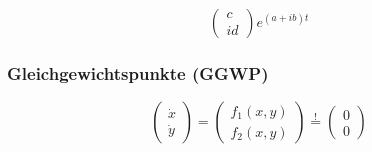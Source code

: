 \begin{itemize}
\begin{enumerate}
\begin{itemize}
$$\begin{pmatrix}
                                c\\id
                            \end{pmatrix}
                            e^{(a+ib)t}
                        $$

                \end{itemize}

            \end{enumerate}
            

    \end{itemize}

    \subsubsection{Gleichgewichtspunkte (GGWP)}
        $$
            \begin{pmatrix}
                \dot{x}\\ \dot{y}
            \end{pmatrix}
            =
            \begin{pmatrix}
                f_1(x,y)\\ f_2(x,y)
            \end{pmatrix}
            \overset{!}{=} 
            \begin{pmatrix}
                0\\0
            \end{pmatrix}
        $$
